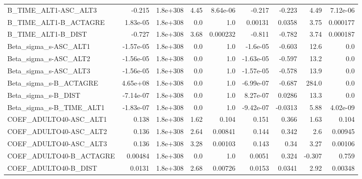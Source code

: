 \begin{tabular}{lrrrrrrrr}
B\_TIME\_ALT1-ASC\_ALT3              &      -0.215 &     1.8e+308 &    4.45 & 8.64e-06 &     -0.217 &      -0.223 &         4.49 &      7.12e-06 \\
B\_TIME\_ALT1-B\_ACTAGRE             &    1.83e-05 &     1.8e+308 &     0.0 &      1.0 &    0.00131 &      0.0358 &         3.75 &      0.000177 \\
B\_TIME\_ALT1-B\_DIST                &      -0.727 &     1.8e+308 &    3.68 & 0.000232 &     -0.811 &      -0.782 &         3.74 &      0.000187 \\
Beta\_sigma\_s-ASC\_ALT1             &   -1.57e-05 &     1.8e+308 &     0.0 &      1.0 &   -1.6e-05 &      -0.603 &         12.6 &           0.0 \\
Beta\_sigma\_s-ASC\_ALT2             &   -1.56e-05 &     1.8e+308 &     0.0 &      1.0 &  -1.63e-05 &      -0.597 &         13.2 &           0.0 \\
Beta\_sigma\_s-ASC\_ALT3             &   -1.56e-05 &     1.8e+308 &     0.0 &      1.0 &  -1.57e-05 &      -0.578 &         13.9 &           0.0 \\
Beta\_sigma\_s-B\_ACTAGRE            &    4.65e+08 &     1.8e+308 &     0.0 &      1.0 &  -6.99e-07 &      -0.687 &        284.0 &           0.0 \\
Beta\_sigma\_s-B\_DIST               &   -7.14e-07 &     1.8e+308 &     0.0 &      1.0 &   8.27e-07 &      0.0286 &         13.3 &           0.0 \\
Beta\_sigma\_s-B\_TIME\_ALT1          &   -1.83e-07 &     1.8e+308 &     0.0 &      1.0 &  -9.42e-07 &     -0.0313 &         5.88 &      4.02e-09 \\
COEF\_ADULTO40-ASC\_ALT1            &       0.138 &     1.8e+308 &    1.62 &    0.104 &      0.151 &       0.366 &         1.63 &         0.104 \\
COEF\_ADULTO40-ASC\_ALT2            &       0.136 &     1.8e+308 &    2.64 &  0.00841 &      0.144 &       0.342 &          2.6 &       0.00945 \\
COEF\_ADULTO40-ASC\_ALT3            &       0.136 &     1.8e+308 &    3.28 &  0.00103 &      0.143 &        0.34 &         3.27 &       0.00106 \\
COEF\_ADULTO40-B\_ACTAGRE           &     0.00484 &     1.8e+308 &     0.0 &      1.0 &     0.0051 &       0.324 &       -0.307 &         0.759 \\
COEF\_ADULTO40-B\_DIST              &      0.0131 &     1.8e+308 &    2.68 &  0.00726 &     0.0153 &      0.0341 &         2.92 &       0.00348 \\

\end{tabular}
